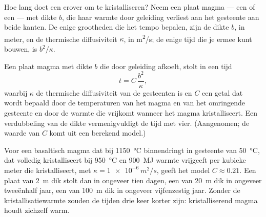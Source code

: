 Hoe lang doet een  erover om te kristalliseren? Neem een plaat
magma --- een  of een  --- met dikte $b$, die haar warmte door
geleiding verliest aan het gesteente aan beide kanten. De enige grootheden die het
tempo bepalen, zijn de dikte $b$, in meter, en de thermische diffusiviteit $\kappa$,
in \unit{m^2/s}; de enige tijd die je ermee kunt bouwen, is $b^2/\kappa$.

\begin{proposition}\label{prop:g11:igneous-rocks:cooling}
Een plaat magma met dikte $b$ die door geleiding afkoelt, stolt in een
tijd
\[
  t = C\,\frac{b^2}{\kappa},
\]
waarbij $\kappa$ de thermische diffusiviteit van de gesteenten is en $C$ een getal dat wordt bepaald
door de temperaturen van het magma en van het omringende gesteente en door de warmte
die vrijkomt wanneer het magma kristalliseert. Een verdubbeling van de dikte vermenigvuldigt de
tijd met vier. (Aangenomen; de waarde van $C$ komt uit een berekend model.)
\end{proposition}

Voor een basaltisch magma dat bij \qty{1150}{\degreeCelsius} binnendringt in gesteente van
\qty{50}{\degreeCelsius}, dat volledig kristalliseert bij
\qty{950}{\degreeCelsius} en \qty{900}{MJ} warmte vrijgeeft per kubieke
meter die kristalliseert, met $\kappa = \qty{1e-6}{m^2/s}$, geeft het model
$C \approx 0.21$. Een plaat van \qty{2}{m} dik stolt dan in ongeveer tien
dagen, een  van \qty{20}{m} dik in ongeveer tweeënhalf jaar, een van
\qty{100}{m} dik in ongeveer vijfenzestig jaar. Zonder de kristallisatiewarmte
zouden de tijden drie keer korter zijn: kristalliserend
magma houdt zichzelf warm.

